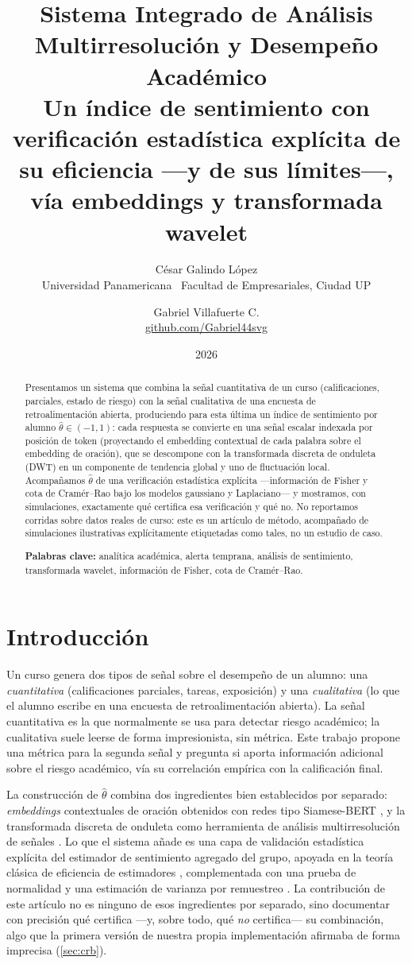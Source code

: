 \documentclass[11pt,a4paper,oneside]{article}
\title{\vspace{-1.5cm}\textbf{\Large Sistema Integrado de Análisis Multirresolución y Desempeño Académico}\\[2pt]
\large Un índice de sentimiento con verificación estadística explícita de su eficiencia —y de sus límites—, vía embeddings y transformada wavelet}
\author{César Galindo López \\ \small Universidad Panamericana \textperiodcentered\ Facultad de Empresariales, Ciudad UP
  \and Gabriel Villafuerte C. \\ \small \href{https://github.com/Gabriel44svg}{github.com/Gabriel44svg}}
\date{\small 2026}
\theoremstyle{definition}
\begin{document}
\maketitle

\begin{abstract}
\noindent Presentamos un sistema que combina la señal cuantitativa de un curso (calificaciones,
parciales, estado de riesgo) con la señal cualitativa de una encuesta de retroalimentación
abierta, produciendo para esta última un índice de sentimiento por alumno
$\hat\theta\in(-1,1)$: cada respuesta se convierte en una señal escalar indexada por posición de
token (proyectando el embedding contextual de cada palabra sobre el embedding de oración), que
se descompone con la transformada discreta de onduleta (DWT) en un componente de tendencia
global y uno de fluctuación local. Acompañamos $\hat\theta$ de una verificación estadística
explícita —información de Fisher y cota de Cramér--Rao bajo los modelos gaussiano y
Laplaciano— y mostramos, con simulaciones, exactamente qué certifica esa verificación y qué no.
No reportamos corridas sobre datos reales de curso: este es un artículo de método,
acompañado de simulaciones ilustrativas explícitamente etiquetadas como tales, no un estudio de
caso.

\medskip
\noindent\textbf{Palabras clave:} analítica académica, alerta temprana, análisis de sentimiento,
transformada wavelet, información de Fisher, cota de Cramér--Rao.
\end{abstract}

\section{Introducción}

Un curso genera dos tipos de señal sobre el desempeño de un alumno: una \emph{cuantitativa}
(calificaciones parciales, tareas, exposición) y una \emph{cualitativa} (lo que el alumno
escribe en una encuesta de retroalimentación abierta). La señal cuantitativa es la que
normalmente se usa para detectar riesgo académico; la cualitativa suele leerse de forma
impresionista, sin métrica. Este trabajo propone una métrica para la segunda señal y pregunta si
aporta información adicional sobre el riesgo académico, vía su correlación empírica con la
calificación final.

La construcción de $\hat\theta$ combina dos ingredientes bien establecidos por separado:
\emph{embeddings} contextuales de oración obtenidos con redes tipo Siamese-BERT
\cite{ReimersGurevych2019}, y la transformada discreta de onduleta como herramienta de análisis
multirresolución de señales \cite{Mallat1989}. Lo que el sistema añade es una capa de validación
estadística explícita del estimador de sentimiento agregado del grupo, apoyada en la teoría
clásica de eficiencia de estimadores \cite{Fisher1922,Rao1945,Cramer1946}, complementada con una
prueba de normalidad \cite{ShapiroWilk1965} y una estimación de varianza por remuestreo
\cite{Efron1979}. La contribución de este artículo no es ninguno de esos ingredientes por
separado, sino documentar con precisión qué certifica —y, sobre todo, qué \emph{no} certifica—
su combinación, algo que la primera versión de nuestra propia implementación afirmaba de forma
imprecisa (\cref{sec:crb}).
\end{document}
